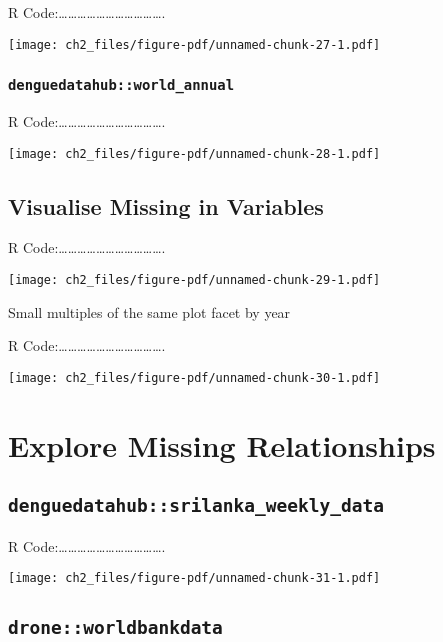 \documentclass[
  letterpaper,
  DIV=11,
  numbers=noendperiod]{scrreprt}
\begin{document}
R
Code:\ldots\ldots\ldots\ldots\ldots\ldots\ldots\ldots\ldots\ldots\ldots.

\texttt{[image: ch2\_files/figure-pdf/unnamed-chunk-27-1.pdf]}

\subsubsection{\texorpdfstring{\texttt{denguedatahub::world\_annual}}{denguedatahub::world\_annual}}\label{denguedatahubworld_annual-2}

R
Code:\ldots\ldots\ldots\ldots\ldots\ldots\ldots\ldots\ldots\ldots\ldots.

\texttt{[image: ch2\_files/figure-pdf/unnamed-chunk-28-1.pdf]}

\subsection{Visualise Missing in
Variables}\label{visualise-missing-in-variables}

R
Code:\ldots\ldots\ldots\ldots\ldots\ldots\ldots\ldots\ldots\ldots\ldots.

\texttt{[image: ch2\_files/figure-pdf/unnamed-chunk-29-1.pdf]}

Small multiples of the same plot facet by year

R
Code:\ldots\ldots\ldots\ldots\ldots\ldots\ldots\ldots\ldots\ldots\ldots.

\texttt{[image: ch2\_files/figure-pdf/unnamed-chunk-30-1.pdf]}

\section{Explore Missing
Relationships}\label{explore-missing-relationships}

\subsection{\texorpdfstring{\texttt{denguedatahub::srilanka\_weekly\_data}}{denguedatahub::srilanka\_weekly\_data}}\label{denguedatahubsrilanka_weekly_data-4}

R
Code:\ldots\ldots\ldots\ldots\ldots\ldots\ldots\ldots\ldots\ldots\ldots.

\texttt{[image: ch2\_files/figure-pdf/unnamed-chunk-31-1.pdf]}

\subsection{\texorpdfstring{\texttt{drone::worldbankdata}}{drone::worldbankdata}}\label{droneworldbankdata}
\end{document}
